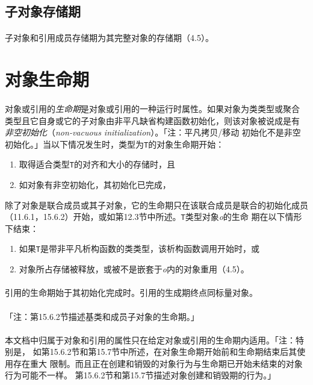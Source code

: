 \subsection{子对象存储期}
\paragraph{}
子对象和引用成员存储期为其完整对象的存储期（4.5）。

\section{对象生命期}
\paragraph{}
对象或引用的\textit{生命期}是对象或引用的一种运行时属性。如果对象为类类型或聚合
类型且它自身或它的子对象由非平凡缺省构建函数初始化，则该对象被说成是有
\textit{非空初始化}（\textit{non-vacuous initialization}）。「注：平凡拷贝/移动
初始化不是非空初始化。」当以下情况发生时，类型为\texttt{T}的对象生命期开始：
\begin{enumerate}
  \item{取得适合类型\texttt{T}的对齐和大小的存储时，且}
  \item{如对象有非空初始化，其初始化已完成，}
\end{enumerate}
除了对象是联合成员或其子对象，它的生命期只在该联合成员是联合的初始化成员
（11.6.1，15.6.2）开始，或如第12.3节中所述。\texttt{T}类型对象\textit{o}的生命
期在以下情形下结束：
\begin{enumerate}
  \item{如果\texttt{T}是带非平凡析构函数的类类型，该析构函数调用开始时，或}
  \item{对象所占存储被释放，或被不是嵌套于\textit{o}内的对象重用（4.5）。}
\end{enumerate}

\paragraph{}
引用的生命期始于其初始化完成时。引用的生成期终点同标量对象。

\paragraph{}
「注：第15.6.2节描述基类和成员子对象的生命期。」

\paragraph{}
本文档中归属于对象和引用的属性只在给定对象或引用的生命期内适用。「注：特别是，
如第15.6.2节和第15.7节中所述，在对象生命期开始前和生命期结束后其使用存在重大
限制。而且正在创建和销毁的对象行为与生命期已开始未结束的对象行为可能不一样。
第15.6.2节和第15.7节描述对象创建和销毁期的行为。」

